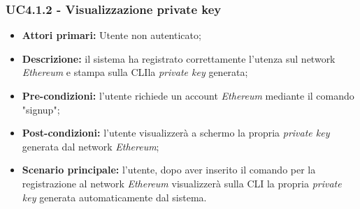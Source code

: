\subsubsection{UC4.1.2 - Visualizzazione private key\glo}
\begin{itemize}
	\item \textbf{Attori primari:} Utente non autenticato;
	\item \textbf{Descrizione:} il sistema ha registrato correttamente l'utenza sul network \textit{Ethereum\glos} e stampa sulla CLI\glo la \textit{private key\glo} generata; 
	\item \textbf{Pre-condizioni:} l'utente richiede un account \textit{Ethereum\glo} mediante il comando "signup"; 
	\item \textbf{Post-condizioni:} l'utente visualizzerà a schermo la propria \textit{private key\glo} generata dal network \textit{Ethereum\glos};
	\item \textbf{Scenario principale:} l'utente, dopo aver inserito il comando per la registrazione al network \textit{Ethereum\glo} visualizzerà sulla CLI la propria \textit{private key\glo} generata automaticamente dal sistema.
\end{itemize}